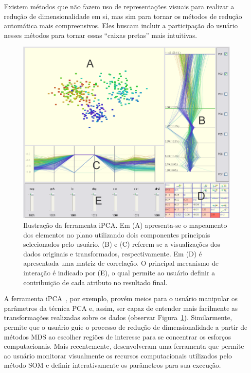Existem métodos que não fazem uso de representações
visuais para realizar a redução de dimensionalidade em si,
mas sim para tornar os métodos de redução automática mais
compreensivos. Eles buscam incluir a participação do usuário
nesses métodos para tornar essas ``caixas pretas'' mais
intuitivas. 

\begin{figure}[h!]
    \centering
    \includegraphics[width=12cm]{images/ipca.png}
    \caption[iPCA]{Ilustração da ferramenta iPCA. Em (A)
    apresenta-se o mapeamento dos elementos no plano
utilizando dois componentes principais selecionados pelo
usuário. (B) e (C) referem-se a visualizações dos dados
originais e transformados, respectivamente. Em (D) é
apresentada uma matriz de correlação. O principal mecanismo
de interação é indicado por (E), o qual permite ao usuário
definir a contribuição de cada atributo no resultado final.}
    \label{fig:ipca}
\end{figure}

A ferramenta iPCA~\cite{Jeong2009}, por exemplo, provém meios
para o usuário manipular os parâmetros da técnica PCA e,
assim, ser capaz de entender mais facilmente as
transformações realizadas sobre os dados (observar
Figura~\ref{fig:ipca}). Similarmente, \cite{Williams2004}
permite que o usuário guie o processo de redução de
dimensionalidade a partir de métodos MDS ao escolher regiões
de interesse para se concentrar os esforços computacionais.
Mais recentemente, \cite{Schreck2008} desenvolveram uma
ferramenta que permite ao usuário monitorar visualmente os
recursos computacionais utilizados pelo método SOM e definir
interativamente os parâmetros para sua execução.

